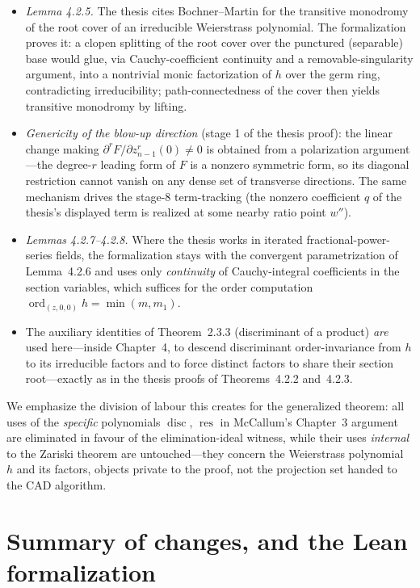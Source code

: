 \documentclass[11pt,a4paper]{article}
\theoremstyle{plain}
\theoremstyle{definition}
\DeclareMathOperator{\ord}{ord}
\DeclareMathOperator{\res}{res}
\DeclareMathOperator{\disc}{disc}
\begin{document}
\begin{itemize}[leftmargin=2em]
\item \emph{Lemma 4.2.5.} The thesis cites Bochner--Martin for the transitive
monodromy of the root cover of an irreducible Weierstrass polynomial. The
formalization proves it: a clopen splitting of the root cover over the
punctured (separable) base would glue, via Cauchy-coefficient continuity and a
removable-singularity argument, into a nontrivial monic factorization of $h$
over the germ ring, contradicting irreducibility; path-connectedness of the
cover then yields transitive monodromy by lifting.
\item \emph{Genericity of the blow-up direction} (stage 1 of the thesis
proof): the linear change making $\partial^r F/\partial z_{n-1}^r(0)\neq 0$ is
obtained from a polarization argument---the degree-$r$ leading form of $F$ is
a nonzero symmetric form, so its diagonal restriction cannot vanish on any
dense set of transverse directions. The same mechanism drives the stage-8
term-tracking (the nonzero coefficient $q$ of the thesis's displayed term is
realized at some nearby ratio point $w''$).
\item \emph{Lemmas 4.2.7--4.2.8.} Where the thesis works in iterated
fractional-power-series fields, the formalization stays with the convergent
parametrization of Lemma~4.2.6 and uses only \emph{continuity} of
Cauchy-integral coefficients in the section variables, which suffices for the
order computation $\ord_{(z,0,0)}h=\min(m,m_1)$.
\item The auxiliary identities of Theorem~2.3.3 (discriminant of a product)
\emph{are} used here---inside Chapter~4, to descend discriminant
order-invariance from $h$ to its irreducible factors and to force distinct
factors to share their section root---exactly as in the thesis proofs of
Theorems~4.2.2 and~4.2.3.
\end{itemize}

We emphasize the division of labour this creates for the generalized theorem:
all uses of the \emph{specific} polynomials $\disc$, $\res$ in McCallum's
Chapter~3 argument are eliminated in favour of the elimination-ideal witness,
while their uses \emph{internal} to the Zariski theorem are untouched---they
concern the Weierstrass polynomial $h$ and its factors, objects private to the
proof, not the projection set handed to the CAD algorithm.

\section{Summary of changes, and the Lean formalization}\label{sec:lean}
\end{document}
